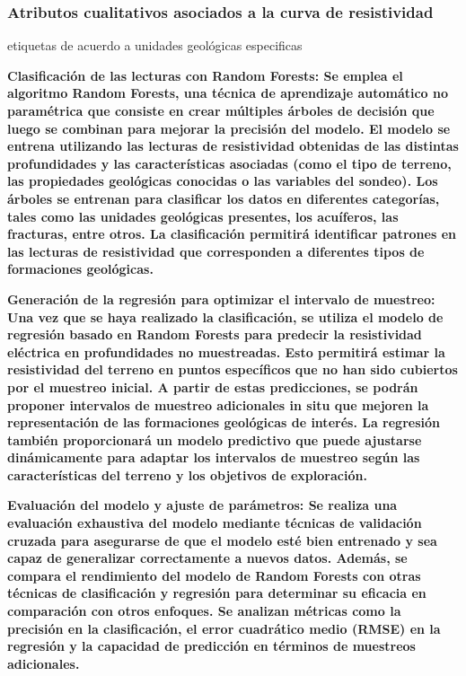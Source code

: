 		\subsubsection{Atributos cualitativos asociados a la curva de resistividad}
			
			etiquetas de acuerdo a unidades geológicas especificas

\textbf{Clasificación de las lecturas con Random Forests: Se emplea el algoritmo Random Forests, una técnica de aprendizaje automático no paramétrica que consiste en crear múltiples árboles de decisión que luego se combinan para mejorar la precisión del modelo. El modelo se entrena utilizando las lecturas de resistividad obtenidas de las distintas profundidades y las características asociadas (como el tipo de terreno, las propiedades geológicas conocidas o las variables del sondeo). Los árboles se entrenan para clasificar los datos en diferentes categorías, tales como las unidades geológicas presentes, los acuíferos, las fracturas, entre otros. La clasificación permitirá identificar patrones en las lecturas de resistividad que corresponden a diferentes tipos de formaciones geológicas.}

\textbf{Generación de la regresión para optimizar el intervalo de muestreo: Una vez que se haya realizado la clasificación, se utiliza el modelo de regresión basado en Random Forests para predecir la resistividad eléctrica en profundidades no muestreadas. Esto permitirá estimar la resistividad del terreno en puntos específicos que no han sido cubiertos por el muestreo inicial. A partir de estas predicciones, se podrán proponer intervalos de muestreo adicionales in situ que mejoren la representación de las formaciones geológicas de interés. La regresión también proporcionará un modelo predictivo que puede ajustarse dinámicamente para adaptar los intervalos de muestreo según las características del terreno y los objetivos de exploración.}

\textbf{Evaluación del modelo y ajuste de parámetros: Se realiza una evaluación exhaustiva del modelo mediante técnicas de validación cruzada para asegurarse de que el modelo esté bien entrenado y sea capaz de generalizar correctamente a nuevos datos. Además, se compara el rendimiento del modelo de Random Forests con otras técnicas de clasificación y regresión para determinar su eficacia en comparación con otros enfoques. Se analizan métricas como la precisión en la clasificación, el error cuadrático medio (RMSE) en la regresión y la capacidad de predicción en términos de muestreos adicionales.}

